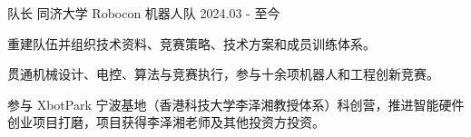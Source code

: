 
\begin{cventries}

  \cventry
    {队长}
    {同济大学 Robocon 机器人队}
    {}
    {2024.03 - 至今}
    {
      \begin{cvitems}
        \item {重建队伍并组织技术资料、竞赛策略、技术方案和成员训练体系。}
        \item {贯通机械设计、电控、算法与竞赛执行，参与十余项机器人和工程创新竞赛。}
      \end{cvitems}
    }

  \vspace{-1.8mm}
  \begin{cvparagraph}
  \cvCJK 参与 XbotPark 宁波基地（香港科技大学李泽湘教授体系）科创营，推进智能硬件创业项目打磨，项目获得李泽湘老师及其他投资方投资。
  \end{cvparagraph}

\end{cventries}
